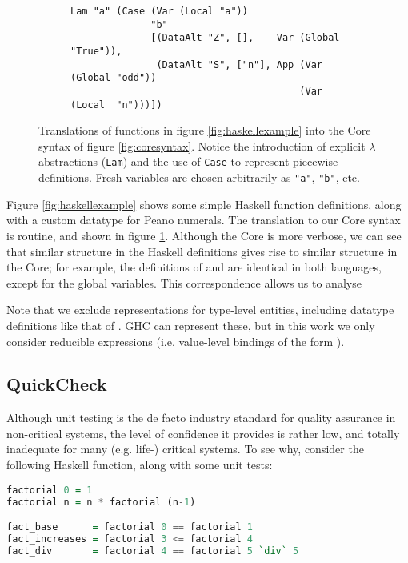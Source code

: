 \begin{figure}
\begin{subfigure}[even]{\textwidth}
\begin{small}
      \begin{verbatim}
Lam "a" (Case (Var (Local "a"))
              "b"
              [(DataAlt "Z", [],    Var (Global "True")),
               (DataAlt "S", ["n"], App (Var (Global "odd"))
                                        (Var (Local  "n")))])
      \end{verbatim}
    \end{small}
  \end{subfigure}
  \caption{Translations of functions in figure \ref{fig:haskellexample} into the Core syntax of figure \ref{fig:coresyntax}. Notice the introduction of explicit $\lambda$ abstractions (\texttt{Lam}) and the use of \texttt{Case} to represent piecewise definitions. Fresh variables are chosen arbitrarily as \texttt{"a"}, \texttt{"b"}, etc.}
  \label{fig:coreexample}
\end{figure}

Figure \ref{fig:haskellexample} shows some simple Haskell function definitions, along with a custom datatype for Peano numerals. The translation to our Core syntax is routine, and shown in figure \ref{fig:coreexample}. Although the Core is more verbose, we can see that similar structure in the Haskell definitions gives rise to similar structure in the Core; for example, the definitions of  and  are identical in both languages, except for the global variables. This correspondence allows us to analyse

Note that we exclude representations for type-level entities, including datatype definitions like that of . GHC can represent these, but in this work we only consider reducible expressions (i.e. value-level bindings of the form ).

\subsection{QuickCheck}
\label{sec:quickcheck}

Although unit testing is the de facto industry standard for quality assurance in non-critical systems, the level of confidence it provides is rather low, and totally inadequate for many (e.g. life-) critical systems. To see why, consider the following Haskell function, along with some unit tests:

\begin{lstlisting}[language=Haskell, xleftmargin=.2\textwidth, xrightmargin=.2\textwidth]
factorial 0 = 1
factorial n = n * factorial (n-1)

fact_base      = factorial 0 == factorial 1
fact_increases = factorial 3 <= factorial 4
fact_div       = factorial 4 == factorial 5 `div` 5
\end{lstlisting}


